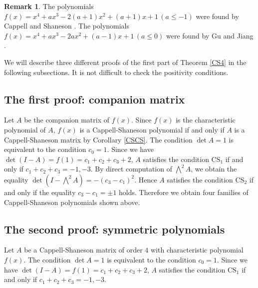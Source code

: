 \documentclass{amsart}
\theoremstyle{plain}
\theoremstyle{definition}
\newtheorem{rem}[thm]{Remark}
\theoremstyle{remark}
\begin{document}
\begin{rem}
The polynomials $f(x)=x^4+ax^3-2(a+1)x^2+(a+1)x+1\, (a\leq -1)$ were found by Cappell and Shaneson 
\cite{CS1976}. The polynomials $f(x)=x^4+ax^3-2ax^2+(a-1)x+1\, (a\leq 0)$ were found by 
Gu and Jiang \cite{GJ1999}. 
\end{rem}

We will describe three different proofs of the first part of Theorem \ref{CS4} in the following subsections. 
It is not difficult to check the positivity conditions. 

\subsection{The first proof: companion matrix}

Let $A$ be the companion matrix of $f(x)$. 
Since $f(x)$ is the characteristic polynomial of $A$, $f(x)$ is a Cappell-Shaneson polynomial 
if and only if $A$ is a Cappell-Shaneson matrix by Corollary \ref{CSCS}. 
The condition $\det A=1$ is equivalent to the condition $c_0=1$. 
Since we have $\det(I-A)=f(1)=c_1+c_2+c_3+2$, 
$A$ satisfies the condition $\mathrm{CS}_1$ if and only if $c_1+c_2+c_3=-1,-3$. 
By direct computation of $\bigwedge^2A$, we obtain the equality $\det(I-\bigwedge^2A)=-(c_3-c_1)^2$. 
Hence $A$ satisfies the condition $\mathrm{CS}_2$ if and only if the equality $c_3-c_1=\pm 1$ holds. 
Therefore we obtain four families of Cappell-Shaneson polynomials shown above. 

\subsection{The second proof: symmetric polynomials}

Let $A$ be a Cappell-Shaneson matrix of order $4$ with characteristic polynomial $f(x)$. 
The condition $\det A=1$ is equivalent to the condition $c_0=1$. 
Since we have $\det(I-A)=f(1)=c_1+c_2+c_3+2$, 
$A$ satisfies the condition $\mathrm{CS}_1$ if and only if $c_1+c_2+c_3=-1,-3$. 
\end{document}
